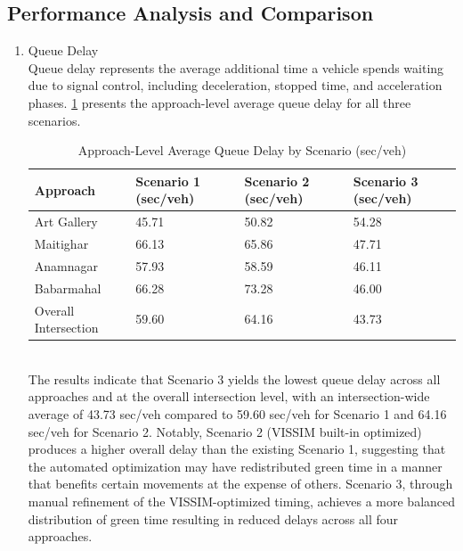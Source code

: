 \subsection{Performance Analysis and Comparison}

\begin{enumerate}[label=\alph*.]
   \item Queue Delay \\
   Queue delay represents the average additional time a vehicle spends waiting due to signal control, including deceleration, stopped time, and acceleration phases. \cref{tab:qd} presents the approach-level average queue delay for all three scenarios.
   \begin{table}[h!]
   \centering
   \caption{Approach-Level Average Queue Delay by Scenario (sec/veh)}
   \begin{tabular}{|l|p{2.5cm}|p{2.5cm}|p{2.5cm}|}
   \hline
   Approach & Scenario 1 (sec/veh) & Scenario 2 (sec/veh) & Scenario 3 (sec/veh) \\
   \hline
   Art Gallery & 45.71 & 50.82 & 54.28 \\
   Maitighar & 66.13 & 65.86 & 47.71 \\
   Anamnagar & 57.93 & 58.59 & 46.11 \\
   Babarmahal & 66.28 & 73.28 & 46.00 \\
   \hline
   Overall Intersection & 59.60 & 64.16 & 43.73 \\
   \hline
   \end{tabular}
   \label{tab:qd}
   \end{table}
   \\The results indicate that Scenario 3 yields the lowest queue delay across all approaches and at the overall intersection level, with an intersection-wide average of 43.73 sec/veh compared to 59.60 sec/veh for Scenario 1 and 64.16 sec/veh for Scenario 2. Notably, Scenario 2 (VISSIM built-in optimized) produces a higher overall delay than the existing Scenario 1, suggesting that the automated optimization may have redistributed green time in a manner that benefits certain movements at the expense of others. Scenario 3, through manual refinement of the VISSIM-optimized timing, achieves a more balanced distribution of green time resulting in reduced delays across all four approaches.


\end{enumerate}
